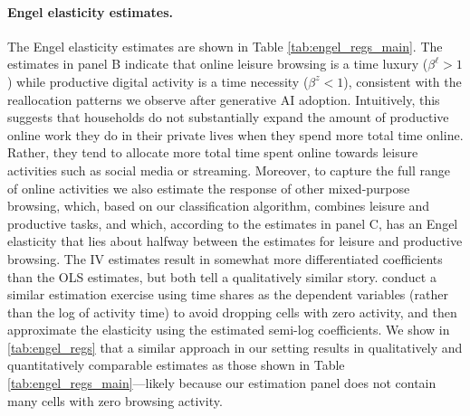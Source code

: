\documentclass[12pt]{article}
\begin{document}
\paragraph{Engel elasticity estimates.} The Engel elasticity estimates are shown in Table \ref{tab:engel_regs_main}. The estimates in panel B indicate that online leisure browsing is a time luxury ($\beta^{\ell}>1$) while productive digital activity is a time necessity ($\beta^{z}<1$), consistent with the reallocation patterns we
observe after generative AI adoption.  Intuitively, this suggests that households do not substantially expand the amount of productive online work they do in their private lives when they spend more total time online. Rather, they tend to allocate more total time spent online towards leisure activities such as social media or streaming. Moreover, to capture the full range of online activities we also estimate the response of other mixed-purpose browsing, which, based on our classification algorithm, combines leisure and productive tasks, and which, according to the estimates in panel C, has an Engel elasticity that lies about halfway between the estimates for leisure and productive browsing. The IV estimates result in somewhat more differentiated coefficients than the OLS estimates, but both tell a qualitatively similar story. \cite{aguiar2021} conduct a similar estimation exercise using time shares  as the dependent variables (rather than the log of activity time) to avoid dropping cells with zero activity, and then approximate the elasticity using the estimated semi-log coefficients. We show in \ref{tab:engel_regs} that a similar approach in our setting results in qualitatively and quantitatively comparable estimates as those shown in Table \ref{tab:engel_regs_main}---likely because our estimation panel does not contain many cells with zero browsing activity.
\end{document}

